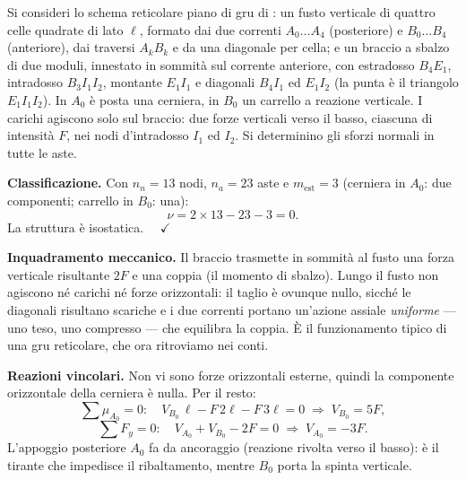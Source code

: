 \begin{esercizio}
	\label{ex:gru}
	
	Si consideri lo schema reticolare piano di gru di
	: un fusto verticale di quattro
	celle quadrate di lato $\ell$, formato dai due correnti
	$A_0\dots A_4$ (posteriore) e $B_0\dots B_4$ (anteriore),
	dai traversi $A_kB_k$ e da una diagonale per cella; e un
	braccio a sbalzo di due moduli, innestato in sommità sul
	corrente anteriore, con estradosso $B_4E_1$, intradosso
	$B_3I_1I_2$, montante $E_1I_1$ e diagonali $B_4I_1$ ed
	$E_1I_2$ (la punta è il triangolo $E_1I_1I_2$). In $A_0$
	è posta una cerniera, in $B_0$ un carrello a reazione
	verticale. I carichi agiscono solo sul braccio: due forze
	verticali verso il basso, ciascuna di intensità $F$, nei
	nodi d'intradosso $I_1$ ed $I_2$. Si determinino gli
	sforzi normali in tutte le aste.
	
	\begin{svolgimento}
		



		
		\noindent\textbf{Classificazione.}
		Con $n_n = 13$ nodi, $n_a = 23$ aste e
		$m_\text{est} = 3$ (cerniera in $A_0$: due
		componenti; carrello in $B_0$: una):
		\[
		\nu = 2\times 13 - 23 - 3 = 0 .
		\]
		La struttura è isostatica. $\quad\checkmark$
		
		\noindent\textbf{Inquadramento meccanico.}
		Il braccio trasmette in sommità al fusto una forza
		verticale risultante $2F$ e una coppia (il momento di
		sbalzo). Lungo il fusto non agiscono né carichi né
		forze orizzontali: il taglio è ovunque nullo, sicché
		le diagonali risultano scariche e i due correnti
		portano un'azione assiale \emph{uniforme} --- uno
		teso, uno compresso --- che equilibra la coppia. È il
		funzionamento tipico di una gru reticolare, che ora
		ritroviamo nei conti.
		
		\noindent\textbf{Reazioni vincolari.}
		Non vi sono forze orizzontali esterne, quindi la
		componente orizzontale della cerniera è nulla. Per il
		resto:
		\[
		\sum \mu_{A_0} = 0:\quad
		V_{B_0}\,\ell - F\,2\ell - F\,3\ell = 0
		\;\Rightarrow\;
		V_{B_0} = 5F,
		\]
		\[
		\sum F_y = 0:\quad
		V_{A_0} + V_{B_0} - 2F = 0
		\;\Rightarrow\;
		V_{A_0} = -3F .
		\]
		L'appoggio posteriore $A_0$ fa da ancoraggio (reazione
		rivolta verso il basso): è il tirante che impedisce il
		ribaltamento, mentre $B_0$ porta la spinta verticale.
		

\end{svolgimento}
\end{esercizio}

